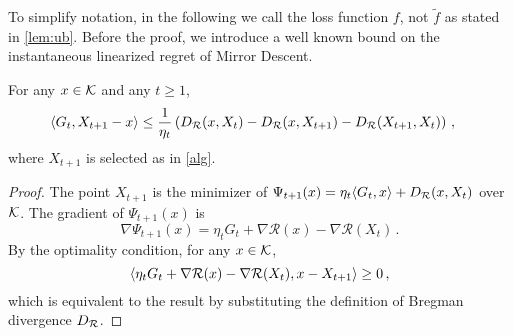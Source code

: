To simplify notation, in the following we call the loss function $f$, not $\tilde{f}$ as stated in \cref{lem:ub}. Before the proof, we introduce a well known bound on the instantaneous linearized regret of Mirror Descent.
\begin{lemma}
\label{lem:mdlinregret}
For any $x \in \mathcal{K}$ and any $t \ge 1$,
\begin{align*}
\MoveEqLeft
\ip{G_t, X_{t+1}-x}
\le \dfrac{1}{\eta_t} \left( \DR(x,X_t)-\DR(x,X_{t+1})-\DR(X_{t+1},X_t) \right)\,,
\end{align*}
where $X_{t+1}$ is selected as in \cref{alg}.
\end{lemma}
\begin{proof}
The point $X_{t+1}$ is the minimizer of
$\Psi_{t+1}(x)=\eta_t \langle G_t,x \rangle+D_{\mathcal{R}}(x,X_t)$ over $\mathcal{K}$. The gradient of $\Psi_{t+1}(x)$ is
\[
\nabla \Psi_{t+1}(x) = \eta_t G_t + \nabla\mathcal{R}(x)-\nabla\mathcal{R}(X_t)\,.
\]
By the optimality condition, for any $x \in \mathcal{K}$,
\[
\langle \eta_t G_t + \nabla\mathcal{R}(x)-\nabla\mathcal{R}(X_t), x-X_{t+1} \rangle\ge 0 \,,
\]
which is equivalent to the result by substituting the definition of Bregman divergence $D_{\mathcal{R}}$.
\end{proof}


